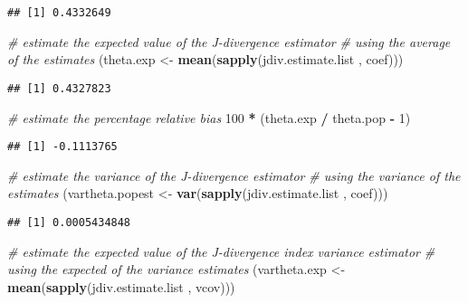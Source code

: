 \documentclass[
]{book}
\newenvironment{Shaded}{\begin{snugshade}}{\end{snugshade}}
\newcommand{\CommentTok}[1]{\textcolor[rgb]{0.56,0.35,0.01}{\textit{#1}}}
\newcommand{\DecValTok}[1]{\textcolor[rgb]{0.00,0.00,0.81}{#1}}
\newcommand{\FunctionTok}[1]{\textcolor[rgb]{0.13,0.29,0.53}{\textbf{#1}}}
\newcommand{\NormalTok}[1]{#1}
\newcommand{\OtherTok}[1]{\textcolor[rgb]{0.56,0.35,0.01}{#1}}
\newcommand{\SpecialCharTok}[1]{\textcolor[rgb]{0.81,0.36,0.00}{\textbf{#1}}}
\begin{document}
\begin{verbatim}
## [1] 0.4332649
\end{verbatim}

\begin{Shaded}
\begin{Highlighting}[]
\CommentTok{\# estimate the expected value of the J{-}divergence estimator}
\CommentTok{\# using the average of the estimates}
\NormalTok{(theta.exp }\OtherTok{\textless{}{-}} \FunctionTok{mean}\NormalTok{(}\FunctionTok{sapply}\NormalTok{(jdiv.estimate.list , coef)))}
\end{Highlighting}
\end{Shaded}

\begin{verbatim}
## [1] 0.4327823
\end{verbatim}

\begin{Shaded}
\begin{Highlighting}[]
\CommentTok{\# estimate the percentage relative bias}
\DecValTok{100} \SpecialCharTok{*}\NormalTok{ (theta.exp }\SpecialCharTok{/}\NormalTok{ theta.pop }\SpecialCharTok{{-}} \DecValTok{1}\NormalTok{)}
\end{Highlighting}
\end{Shaded}

\begin{verbatim}
## [1] -0.1113765
\end{verbatim}

\begin{Shaded}
\begin{Highlighting}[]
\CommentTok{\# estimate the variance of the J{-}divergence estimator}
\CommentTok{\# using the variance of the estimates}
\NormalTok{(vartheta.popest }\OtherTok{\textless{}{-}} \FunctionTok{var}\NormalTok{(}\FunctionTok{sapply}\NormalTok{(jdiv.estimate.list , coef)))}
\end{Highlighting}
\end{Shaded}

\begin{verbatim}
## [1] 0.0005434848
\end{verbatim}

\begin{Shaded}
\begin{Highlighting}[]
\CommentTok{\# estimate the expected value of the J{-}divergence index variance estimator}
\CommentTok{\# using the expected of the variance estimates}
\NormalTok{(vartheta.exp }\OtherTok{\textless{}{-}} \FunctionTok{mean}\NormalTok{(}\FunctionTok{sapply}\NormalTok{(jdiv.estimate.list , vcov)))}
\end{Highlighting}
\end{Shaded}
\end{document}
